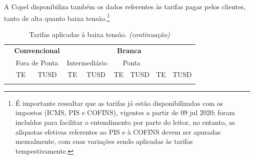 \documentclass[grad,numbers]{coppe}
\begin{document}
  A Copel disponibiliza também os dados referentes às tarifas pagas pelos clientes, tanto de alta quanto baixa tensão.\footnote{É importante ressaltar que as tarifas já estão disponibilizadas com os impostos (ICMS, PIS e COFINS), vigentes a partir de 09 jul 2020; foram incluídos para facilitar o entendimento por parte do leitor, no entanto, as alíquotas efetivas referentes ao PIS e à COFINS devem ser apuradas mensalmente, com suas variações sendo aplicadas às tarifas tempestivamente.}

  \begingroup\fontsize{10}{12}\selectfont
  \begin{longtable}[t]{>{\centering\arraybackslash}p{8em}cccccccc}
  \caption{\label{tab:unnamed-chunk-15}Tarifas aplicadas à baixa tensão.}\\
  \toprule
  \multicolumn{1}{c}{\textbf{ }} & \multicolumn{2}{c}{\textbf{Convencional}} & \multicolumn{6}{c}{\textbf{Branca}} \\
  \cmidrule(l{3pt}r{3pt}){2-3} \cmidrule(l{3pt}r{3pt}){4-9}
  \multicolumn{3}{c}{ } & \multicolumn{2}{c}{Fora de Ponta} & \multicolumn{2}{c}{Intermediário} & \multicolumn{2}{c}{Ponta} \\
  \cmidrule(l{3pt}r{3pt}){4-5} \cmidrule(l{3pt}r{3pt}){6-7} \cmidrule(l{3pt}r{3pt}){8-9}
  \multicolumn{1}{c}{ } & \multicolumn{1}{c}{TE} & \multicolumn{1}{c}{TUSD} & \multicolumn{1}{c}{TE} & \multicolumn{1}{c}{TUSD} & \multicolumn{1}{c}{TE} & \multicolumn{1}{c}{TUSD} & \multicolumn{1}{c}{TE} & \multicolumn{1}{c}{TUSD} \\
  \cmidrule(l{3pt}r{3pt}){2-2} \cmidrule(l{3pt}r{3pt}){3-3} \cmidrule(l{3pt}r{3pt}){4-4} \cmidrule(l{3pt}r{3pt}){5-5} \cmidrule(l{3pt}r{3pt}){6-6} \cmidrule(l{3pt}r{3pt}){7-7} \cmidrule(l{3pt}r{3pt}){8-8} \cmidrule(l{3pt}r{3pt}){9-9}
  \endfirsthead
  \caption[]{\label{tab:unnamed-chunk-15}Tarifas aplicadas à baixa tensão. \textit{(continuação)}}\\
  \toprule
  \endhead


\end{longtable}
\end{document}
